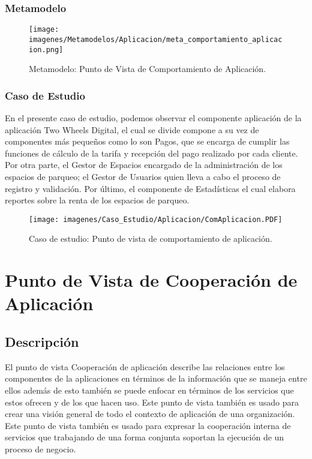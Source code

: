 \subsubsection{Metamodelo}
\begin{figure}[h]
	\centering
	\texttt{[image: imagenes/Metamodelos/Aplicacion/meta\_comportamiento\_aplicacion.png]}
	\caption{Metamodelo: Punto de Vista de Comportamiento de Aplicación.}
	\label{fig:gap_analysis}
\end{figure}

\subsubsection{Caso de Estudio}
En el presente caso de estudio, podemos observar el componente aplicación de la aplicación Two Wheels Digital, el cual se divide compone a su vez de componentes más pequeños como lo son Pagos, que se encarga de cumplir las funciones de cálculo de la tarifa y recepción del pago realizado por cada cliente. Por otra parte, el Gestor de Espacios encargado de la administración de los espacios de parqueo; el Gestor de Usuarios quien lleva a cabo el proceso de registro y validación. Por último, el componente de Estadísticas el cual elabora reportes sobre la renta de los espacios de parqueo.
\begin{figure}[h]
	\centering
	\texttt{[image: imagenes/Caso\_Estudio/Aplicacion/ComAplicacion.PDF]}
	\caption{Caso de estudio: Punto de vista de comportamiento de aplicación.}
	\label{fig:gap_analysis}
\end{figure}




\section{Punto de Vista de Cooperación de Aplicación}
\subsection{Descripción}
El punto de vista Cooperación de aplicación describe las relaciones entre los componentes de la aplicaciones en términos de la información que se maneja entre ellos además de esto también se puede enfocar en términos de los servicios que estos ofrecen y de los que hacen uso. Este punto de vista también es usado para crear una visión general de todo el contexto de aplicación de una organización. Este punto de vista también es usado para expresar la cooperación interna de servicios que trabajando de una forma conjunta soportan la ejecución de un proceso de negocio.

